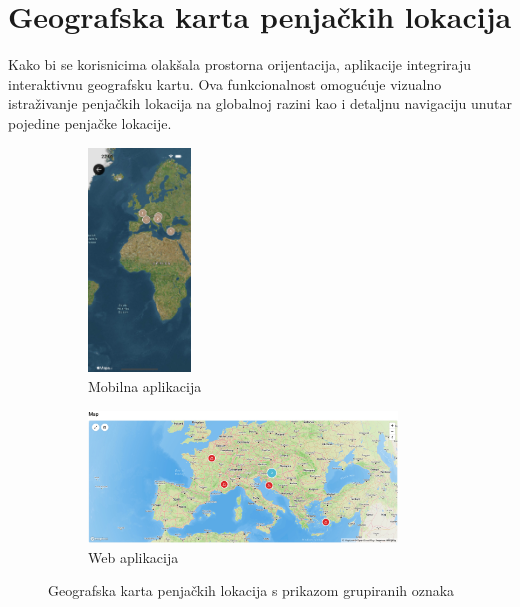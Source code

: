 \section{Geografska karta penjačkih lokacija}

Kako bi se korisnicima olakšala prostorna orijentacija, aplikacije integriraju interaktivnu geografsku kartu. Ova funkcionalnost omogućuje vizualno istraživanje penjačkih lokacija na globalnoj razini kao i detaljnu navigaciju unutar pojedine penjačke lokacije.

\begin{figure}[H]
    \centering
    \begin{subfigure}[b]{\textwidth}
        \centering
        \includegraphics[width=0.3\textwidth]{images/implementacija/geo_karta.png}
        \caption{Mobilna aplikacija}
        \label{fig:geografska_karta_mob}
    \end{subfigure}
    \hfill
    \begin{subfigure}[b]{\textwidth}
        \centering
        \includegraphics[width=0.9\textwidth]{images/implementacija/web/map_clusters.jpeg}
        \caption{Web aplikacija}
        \label{fig:geografska_karta_web}
    \end{subfigure}
    \caption{Geografska karta penjačkih lokacija s prikazom grupiranih oznaka}
    \label{fig:geografska_karta_sidebyside}
\end{figure}

